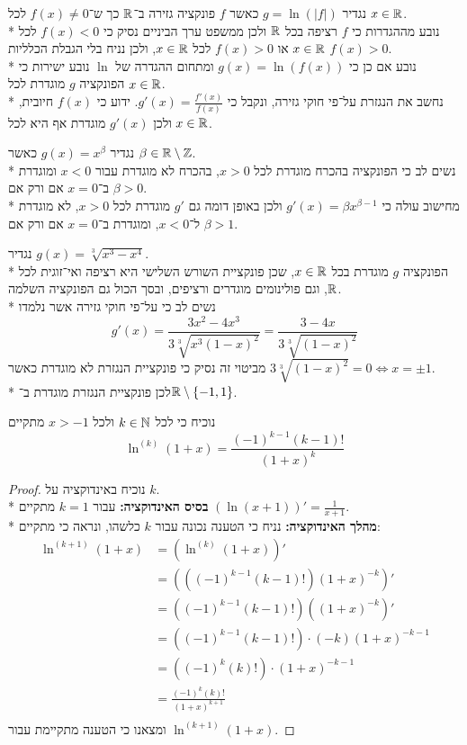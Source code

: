 \Subquestion{}
נגדיר $g = \ln(|f|)$ כאשר $f$ פונקציה גזירה ב־$\mathbb{R}$ כך ש־$f(x) \ne 0$ לכל $x \in \mathbb{R}$. \\*
נובע מההגדרות כי $f$ רציפה בכל $\mathbb{R}$ ולכן ממשפט ערך הביניים נסיק כי $f(x) < 0$ לכל $x \in \mathbb{R}$ או $f(x) > 0$ לכל $x \in \mathbb{R}$, ולכן נניח בלי הגבלת הכלליות $f(x) > 0$. \\*
נובע אם כן כי $g(x) = \ln(f(x))$ ומתחום ההגדרה של $\ln$ נובע ישירות כי הפונקציה $g$ מוגדרת לכל $x \in \mathbb{R}$. \\*
נחשב את הנגזרת על־פי חוקי גזירה, ונקבל כי $g'(x) = \frac{f'(x)}{f(x)}$. ידוע כי $f(x)$ חיובית, ולכן $g'(x)$ מוגדרת אף היא לכל $x \in \mathbb{R}$.

\Subquestion{}
נגדיר $g(x) = x^\beta$ כאשר $\beta \in \mathbb{R} \setminus \mathbb{Z}$. \\*
נשים לב כי הפונקציה בהכרח מוגדרת לכל $x > 0$, בהכרח לא מוגדרת עבור $x < 0$ ומוגדרת ב־$x = 0$ אם ורק אם $\beta > 0$. \\*
מחישוב עולה כי $g'(x) = \beta x^{\beta - 1}$ ולכן באופן דומה גם $g'$ מוגדרת לכל $x > 0$, לא מוגדרת ל־$x < 0$, ומוגדרת ב־$x = 0$ אם ורק אם $\beta > 1$.

\Subquestion{}
נגדיר $g(x) = \sqrt[3]{x^3 - x^4}$. \\*
הפונקציה $g$ מוגדרת בכל $x \in \mathbb{R}$, שכן פונקציית השורש השלישי היא רציפה ואי־זוגית לכל $\mathbb{R}$, וגם פולינומים מוגדרים ורציפים, ובסך הכול גם הפונקציה השלמה. \\*
נשים לב כי על־פי חוקי גזירה אשר נלמדו
\[
	g'(x) = \frac{3x^2 - 4x^3}{3 \sqrt[3]{{x^3(1 - x)}^2}}
	= \frac{3 - 4x}{3 \sqrt[3]{{(1 - x)}^2}}
\]
מביטוי זה נסיק כי פונקציית הנגזרת לא מוגדרת כאשר $3 \sqrt[3]{{(1 - x)}^2} = 0 \iff x = \pm 1$. \\*
לכן פונקציית הנגזרת מוגדרת ב־$\mathbb{R} \setminus \{-1, 1\}$.

\Question{}
נוכיח כי לכל $k \in \mathbb{N}$ ולכל $x > -1$ מתקיים
\[
	\ln^{(k)}(1 + x) = \frac{{(-1)}^{k - 1}(k - 1)!}{{(1 + x)}^k}
\]
\begin{proof}
	נוכיח באינדוקציה על $k$. \\*
	\textbf{בסיס האינדוקציה:} עבור $k = 1$ מתקיים $(\ln(x + 1))' = \frac{1}{x + 1}$. \\*
	\textbf{מהלך האינדוקציה:} נניח כי הטענה נכונה עבור $k$ כלשהו, ונראה כי מתקיים:
	\begin{align*}
		\ln^{(k + 1)}(1 + x)
		& = (\ln^{(k)}(1 + x))' \\
		& = (({(-1)}^{k - 1}(k - 1)!){(1 + x)}^{-k})' \\
		& = ({(-1)}^{k - 1}(k - 1)!)({(1 + x)}^{-k})' \\
		& = ({(-1)}^{k - 1}(k - 1)!) \cdot (-k) {(1 + x)}^{-k - 1} \\
		& = ({(-1)}^k(k)!) \cdot {(1 + x)}^{-k - 1} \\
		& = \frac{{(-1)}^k(k)!}{{(1 + x)}^{k + 1}} \\
	\end{align*}
	ומצאנו כי הטענה מתקיימת עבור $\ln^{(k + 1)}(1 + x)$.
\end{proof}

